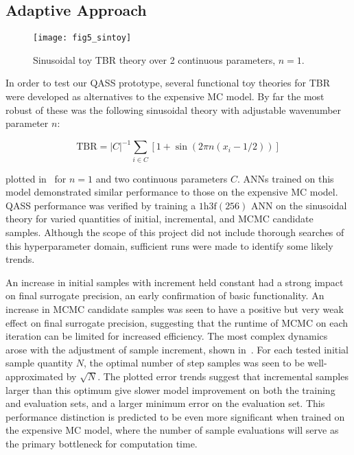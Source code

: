 \subsection{Adaptive Approach}\label{sec:adaptiveres}

\begin{figure}
	\centering
	\texttt{[image: fig5\_sintoy]}
	\caption{Sinusoidal toy TBR theory over 2 continuous parameters,
	$n=1$.}
	\label{fig:sintoy}
\end{figure}

In order to test our QASS prototype, several functional toy theories for TBR were developed as alternatives to the expensive MC model. By far the most robust of these was the following sinusoidal theory with adjustable wavenumber parameter $n$:

\begin{equation}
	\text{TBR} = |C|^{-1}\sum_{i \in C} \left[1 + \sin(2\pi n (x_i - 1/2)) \right]
\end{equation}

plotted in~ for $n=1$ and two continuous parameters $C$.
ANNs trained on this model demonstrated similar performance to those on the expensive
MC model. QASS performance was verified by training a $\text{1h3f}(256)$ ANN on
the sinusoidal theory for varied quantities of initial, incremental, and MCMC
candidate samples. Although the scope of this project did not include thorough
searches of this hyperparameter domain, sufficient runs were made to identify
some likely trends.

An increase in initial samples with increment held constant had a strong impact
on final surrogate precision, an early confirmation of basic functionality. An
increase in MCMC candidate samples was seen to have a positive but very weak
effect on final surrogate precision, suggesting that the runtime of MCMC on each
iteration can be limited for increased efficiency. The most complex dynamics
arose with the adjustment of sample increment, shown in~. For
each tested initial sample quantity $N$, the optimal number of step samples was seen to be well-approximated by $\sqrt{N}$. The plotted error trends suggest that
incremental samples larger than this optimum give slower model improvement on
both the training and evaluation sets, and a larger minimum error on the
evaluation set. This performance distinction is predicted to be even more
significant when trained on the expensive MC model, where the number of sample
evaluations will serve as the primary bottleneck for computation time.

